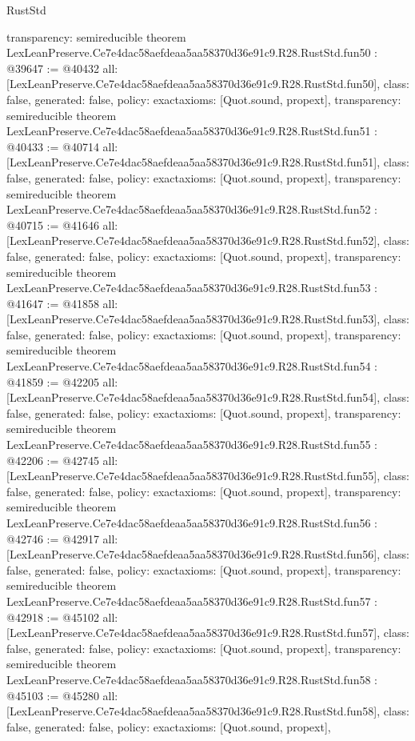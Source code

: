 \begin{lexlean}{RustStd}
\begin{coremodule}
{  transparency: semireducible
}
theorem LexLeanPreserve.Ce7e4dac58aefdeaa5aa58370d36e91c9.R28.RustStd.fun50 : @39647 := @40432 {
  all: [LexLeanPreserve.Ce7e4dac58aefdeaa5aa58370d36e91c9.R28.RustStd.fun50],
  class: false,
  generated: false,
  policy: exact{axioms: [Quot.sound, propext]},
  transparency: semireducible
}
theorem LexLeanPreserve.Ce7e4dac58aefdeaa5aa58370d36e91c9.R28.RustStd.fun51 : @40433 := @40714 {
  all: [LexLeanPreserve.Ce7e4dac58aefdeaa5aa58370d36e91c9.R28.RustStd.fun51],
  class: false,
  generated: false,
  policy: exact{axioms: [Quot.sound, propext]},
  transparency: semireducible
}
theorem LexLeanPreserve.Ce7e4dac58aefdeaa5aa58370d36e91c9.R28.RustStd.fun52 : @40715 := @41646 {
  all: [LexLeanPreserve.Ce7e4dac58aefdeaa5aa58370d36e91c9.R28.RustStd.fun52],
  class: false,
  generated: false,
  policy: exact{axioms: [Quot.sound, propext]},
  transparency: semireducible
}
theorem LexLeanPreserve.Ce7e4dac58aefdeaa5aa58370d36e91c9.R28.RustStd.fun53 : @41647 := @41858 {
  all: [LexLeanPreserve.Ce7e4dac58aefdeaa5aa58370d36e91c9.R28.RustStd.fun53],
  class: false,
  generated: false,
  policy: exact{axioms: [Quot.sound, propext]},
  transparency: semireducible
}
theorem LexLeanPreserve.Ce7e4dac58aefdeaa5aa58370d36e91c9.R28.RustStd.fun54 : @41859 := @42205 {
  all: [LexLeanPreserve.Ce7e4dac58aefdeaa5aa58370d36e91c9.R28.RustStd.fun54],
  class: false,
  generated: false,
  policy: exact{axioms: [Quot.sound, propext]},
  transparency: semireducible
}
theorem LexLeanPreserve.Ce7e4dac58aefdeaa5aa58370d36e91c9.R28.RustStd.fun55 : @42206 := @42745 {
  all: [LexLeanPreserve.Ce7e4dac58aefdeaa5aa58370d36e91c9.R28.RustStd.fun55],
  class: false,
  generated: false,
  policy: exact{axioms: [Quot.sound, propext]},
  transparency: semireducible
}
theorem LexLeanPreserve.Ce7e4dac58aefdeaa5aa58370d36e91c9.R28.RustStd.fun56 : @42746 := @42917 {
  all: [LexLeanPreserve.Ce7e4dac58aefdeaa5aa58370d36e91c9.R28.RustStd.fun56],
  class: false,
  generated: false,
  policy: exact{axioms: [Quot.sound, propext]},
  transparency: semireducible
}
theorem LexLeanPreserve.Ce7e4dac58aefdeaa5aa58370d36e91c9.R28.RustStd.fun57 : @42918 := @45102 {
  all: [LexLeanPreserve.Ce7e4dac58aefdeaa5aa58370d36e91c9.R28.RustStd.fun57],
  class: false,
  generated: false,
  policy: exact{axioms: [Quot.sound, propext]},
  transparency: semireducible
}
theorem LexLeanPreserve.Ce7e4dac58aefdeaa5aa58370d36e91c9.R28.RustStd.fun58 : @45103 := @45280 {
  all: [LexLeanPreserve.Ce7e4dac58aefdeaa5aa58370d36e91c9.R28.RustStd.fun58],
  class: false,
  generated: false,
  policy: exact{axioms: [Quot.sound, propext]},
}
\end{coremodule}
\end{lexlean}
